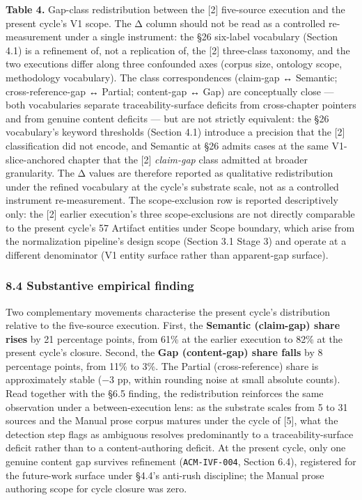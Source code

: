 \documentclass[
]{article}
\begin{document}
\textbf{Table 4.} Gap-class redistribution between the {[}2{]}
five-source execution and the present cycle's V1 scope. The Δ column
should not be read as a controlled re-measurement under a single
instrument: the §26 six-label vocabulary (Section 4.1) is a refinement
of, not a replication of, the {[}2{]} three-class taxonomy, and the two
executions differ along three confounded axes (corpus size, ontology
scope, methodology vocabulary). The class correspondences (claim-gap ↔
Semantic; cross-reference-gap ↔ Partial; content-gap ↔ Gap) are
conceptually close --- both vocabularies separate traceability-surface
deficits from cross-chapter pointers and from genuine content deficits
--- but are not strictly equivalent: the §26 vocabulary's keyword
thresholds (Section 4.1) introduce a precision that the {[}2{]}
classification did not encode, and Semantic at §26 admits cases at the
same V1-slice-anchored chapter that the {[}2{]} \emph{claim-gap} class
admitted at broader granularity. The Δ values are therefore reported as
qualitative redistribution under the refined vocabulary at the cycle's
substrate scale, not as a controlled instrument re-measurement. The
scope-exclusion row is reported descriptively only: the {[}2{]} earlier
execution's three scope-exclusions are not directly comparable to the
present cycle's 57 Artifact entities under Scope boundary, which arise
from the normalization pipeline's design scope (Section 3.1 Stage 3) and
operate at a different denominator (V1 entity surface rather than
apparent-gap surface).

\subsubsection{8.4 Substantive empirical
finding}\label{substantive-empirical-finding}

Two complementary movements characterise the present cycle's
distribution relative to the five-source execution. First, the
\textbf{Semantic (claim-gap) share rises} by 21 percentage points, from
61\% at the earlier execution to 82\% at the present cycle's closure.
Second, the \textbf{Gap (content-gap) share falls} by 8 percentage
points, from 11\% to 3\%. The Partial (cross-reference) share is
approximately stable (−3 pp, within rounding noise at small absolute
counts). Read together with the §6.5 finding, the redistribution
reinforces the same observation under a between-execution lens: as the
substrate scales from 5 to 31 sources and the Manual prose corpus
matures under the cycle of {[}5{]}, what the detection step flags as
ambiguous resolves predominantly to a traceability-surface deficit
rather than to a content-authoring deficit. At the present cycle, only
one genuine content gap survives refinement (\texttt{ACM-IVF-004},
Section 6.4), registered for the future-work surface under §4.4's
anti-rush discipline; the Manual prose authoring scope for cycle closure
was zero.
\end{document}
